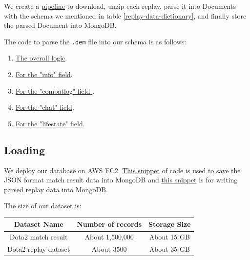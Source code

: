 \documentclass{article}
\newcommand{\codeinline}[1]{
    \texttt{#1}
}
\begin{document}
We create a \href{https://github.com/Vopaaz/big-data-psg-lgd/blob/9916e0a5a95245062d110446eb4014312087ef9e/src/main/java/FetchStore/ValveAPI.java#L389-L418}{pipeline} to download, unzip each replay, parse it into Documents with the schema we mentioned in table \ref{replay-data-dictionary}, and finally store the parsed Document into MongoDB.

The code to parse the \codeinline{.dem} file into our schema is as follows:

\begin{enumerate}
\item \href{https://github.com/Vopaaz/big-data-psg-lgd/blob/master/src/main/java/ParseReplay/ParseReplayExecutor.java}{The overall logic}.
\item \href{https://github.com/Vopaaz/big-data-psg-lgd/blob/master/src/main/java/ParseReplay/Info.java}{For the "info" field}.
\item \href{https://github.com/Vopaaz/big-data-psg-lgd/blob/master/src/main/java/ParseReplay/Combatlog.java}{For the "combatlog" field }.
\item \href{https://github.com/Vopaaz/big-data-psg-lgd/blob/master/src/main/java/ParseReplay/Chat.java}{For the "chat" field}.
\item \href{https://github.com/Vopaaz/big-data-psg-lgd/blob/master/src/main/java/ParseReplay/Lifestate.java}{For the "lifestate" field}.
\end{enumerate}

\subsection{Loading}
We deploy our database on AWS EC2.
\href{https://github.com/Vopaaz/big-data-psg-lgd/blob/a9a285e0e29c0d9e56b41994875df830c7e7b51b/src/main/java/FetchStore/ValveAPI.java#L164-L178}{This snippet} of code is used to save the JSON format match result data into MongoDB and \href{https://github.com/Vopaaz/big-data-psg-lgd/blob/a9a285e0e29c0d9e56b41994875df830c7e7b51b/src/main/java/FetchStore/ValveAPI.java#L406-L420}{this snippet} is for writing parsed replay data into MongoDB.

The size of our dataset is:

\begin{table}[H]
\centering
\begin{tabular}{|c|c|c|}
\hline
Dataset Name & Number of records & Storage Size \\
\hline
Dota2 match result & About 1,500,000 & About 15 GB \\
\hline
Dota2 replay dataset & About 3500 & About 35 GB \\
\hline
\end{tabular}
\end{table}
\end{document}
